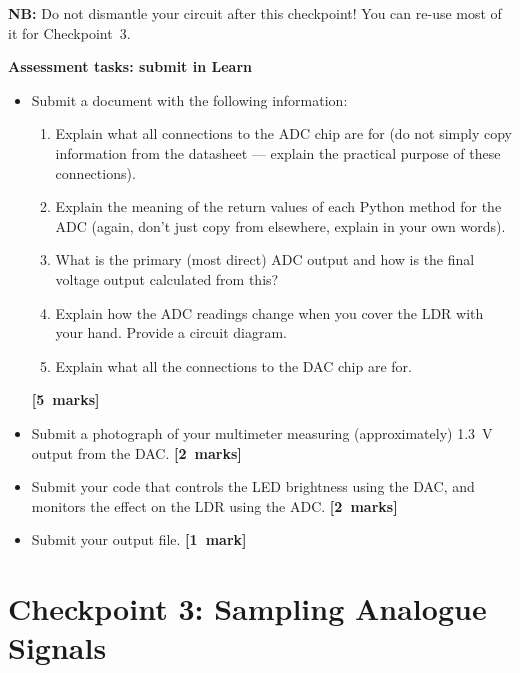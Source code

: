 {\bf NB:} Do not dismantle your circuit after this checkpoint!
You can re-use most of it for Checkpoint~3.

\newpage
{\bf Assessment tasks: submit in Learn}

\begin{itemize}

\item Submit a document with the following information:
\begin{enumerate}
\item Explain what all connections to the ADC chip are for (do not simply copy information from the datasheet --- explain the practical purpose of these connections).
\item Explain the meaning of the return values of each Python method for the ADC (again, don't just copy from elsewhere, explain in your own words).
\item What is the primary (most direct) ADC output and how is the final voltage output calculated from this?
\item Explain how the ADC readings change when you cover the LDR with your hand. Provide a circuit diagram.
\item Explain what all the connections to the DAC chip are for.
\end{enumerate}
\hfill {\bf[5~marks]}

\item Submit a photograph of your multimeter measuring (approximately) 1.3~V output from the DAC.
\hfill {\bf[2~marks]}

\item Submit your code that controls the LED brightness using the DAC, and monitors the effect on the LDR using the ADC.
\hfill {\bf[2~marks]}

\item Submit your output file.
\hfill {\bf[1~mark]}

\end{itemize}


\newpage
\section{Checkpoint 3: Sampling Analogue Signals}

